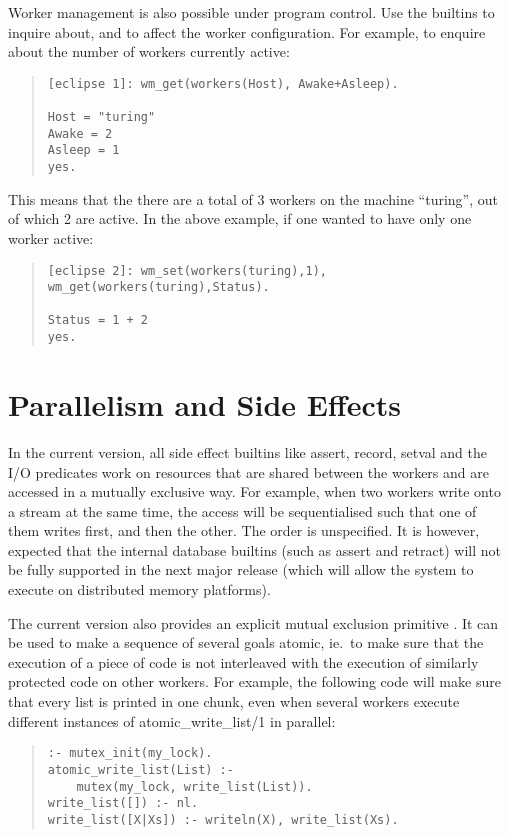Worker management is also possible under program control.  Use the
builtins  to inquire about, and  to affect
the worker configuration. For example, to enquire about the number of
workers currently active:
\begin{quote}\begin{verbatim}
[eclipse 1]: wm_get(workers(Host), Awake+Asleep).

Host = "turing"
Awake = 2
Asleep = 1
yes.
\end{verbatim}\end{quote}

This means that the there are a total of 3 workers on the machine
``turing'', out of which 2 are active. In the above example, if one
wanted to have only one worker active:

\begin{quote}\begin{verbatim}
[eclipse 2]: wm_set(workers(turing),1), wm_get(workers(turing),Status).

Status = 1 + 2
yes.
\end{verbatim}\end{quote}

\section{Parallelism and Side Effects}
In the current version, all side effect builtins like assert, record,
setval and the I/O predicates work on resources that are shared
between the workers and are accessed in a mutually exclusive way.  For
example, when two workers write onto a stream at the same time, the
access will be sequentialised such that one of them writes first, and
then the other. The order is unspecified.  It is however, expected
that the internal database builtins (such as assert and retract) will
not be fully supported in the next major release (which will allow the
system to execute on distributed memory platforms).

The current version also provides an explicit mutual exclusion primitive
. It can be used to make a sequence of several goals atomic,
ie.\ to make sure that the execution of a piece of code is not interleaved
with the execution of similarly protected code on other workers.
For example, the following code will make sure that every list is
printed in one chunk, even when several workers execute different instances
of atomic_write_list/1 in parallel:
\begin{quote}\begin{verbatim}
:- mutex_init(my_lock).
atomic_write_list(List) :-
    mutex(my_lock, write_list(List)).
write_list([]) :- nl.
write_list([X|Xs]) :- writeln(X), write_list(Xs).
\end{verbatim}\end{quote}

